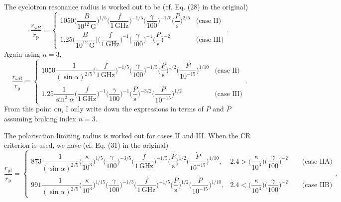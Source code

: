 \documentclass{book}
\newcommand{\rpl}{r_\text{pl}} %
\newcommand{\rwB}{r_{\omega B}} %
\newcommand{\rp}{r_\text{p}} %
\begin{document}
The cyclotron resonance radius is worked out to be (cf. Eq. (28) in the original)
\begin{equation}
    \frac{\rwB}{\rp} = \begin{cases}
        1050 \bigg(\dfrac{B}{10^{12}\,\text{G}}\bigg)^{1/5}
             \bigg(\dfrac{f}{1\,\text{GHz}}\bigg)^{-1/5}
             \bigg(\dfrac{\gamma}{100}\bigg)^{-1/5}
             \bigg(\dfrac{P}{\text{s}}\bigg)^{2/5} & \text{(case II)} \\[15pt]
        1.25 \bigg(\dfrac{B}{10^{12}\,\text{G}}\bigg)
             \bigg(\dfrac{f}{1\,\text{GHz}}\bigg)^{-1}
             \bigg(\dfrac{\gamma}{100}\bigg)^{-1}
             \bigg(\dfrac{P}{\text{s}}\bigg)^{-2} & \text{(case III)}
    \end{cases}.
\end{equation}
Again using $n=3$,
\begin{equation}
    \frac{\rwB}{\rp} = \begin{cases}
        1050 \dfrac{1}{(\sin\alpha)^{2/5}}
             \bigg(\dfrac{f}{1\,\text{GHz}}\bigg)^{-1/5}
             \bigg(\dfrac{\gamma}{100}\bigg)^{-1/5}
             \bigg(\dfrac{P}{\text{s}}\bigg)^{1/2}
             \bigg(\dfrac{\dot{P}}{10^{-15}}\bigg)^{1/10}
             & \text{(case II)} \\[15pt]
        1.25 \dfrac{1}{\sin^2\alpha}
             \bigg(\dfrac{f}{1\,\text{GHz}}\bigg)^{-1}
             \bigg(\dfrac{\gamma}{100}\bigg)^{-1}
             \bigg(\dfrac{P}{\text{s}}\bigg)^{-3/2}
             \bigg(\dfrac{\dot{P}}{10^{-15}}\bigg)^{1/2}
             & \text{(case III)}
    \end{cases}.
\end{equation}
From this point on, I only write down the expressions in terms of $P$ and $\dot{P}$ assuming braking index $n=3$.

The polarisation limiting radius is worked out for cases II and III.
When the CR criterion is used, we have (cf. Eq. (31) in the original)
\begin{equation}
    \frac{\rpl}{\rp} = \begin{cases}
        873 \dfrac{1}{(\sin\alpha)^{2/5}}
             \bigg(\dfrac{\kappa}{10^3}\bigg)^{1/5}
             \bigg(\dfrac{\gamma}{100}\bigg)^{-3/5}
             \bigg(\dfrac{f}{1\,\text{GHz}}\bigg)^{-1/5}
             \bigg(\dfrac{P}{\text{s}}\bigg)^{1/2}
             \bigg(\dfrac{\dot{P}}{10^{-15}}\bigg)^{1/10},
             & 2.4 > \bigg(\dfrac{\kappa}{10^3}\bigg) \bigg(\dfrac{\gamma}{100}\bigg)^{-2} \qquad \text{(case IIA)} \\[15pt]
        991 \dfrac{1}{(\sin\alpha)^{2/5}}
             \bigg(\dfrac{\kappa}{10^3}\bigg)^{1/15}
             \bigg(\dfrac{\gamma}{100}\bigg)^{-1/3}
             \bigg(\dfrac{f}{1\,\text{GHz}}\bigg)^{-1/5}
             \bigg(\dfrac{P}{\text{s}}\bigg)^{1/2}
             \bigg(\dfrac{\dot{P}}{10^{-15}}\bigg)^{1/10},
             & 2.4 < \bigg(\dfrac{\kappa}{10^3}\bigg) \bigg(\dfrac{\gamma}{100}\bigg)^{-2} \qquad \text{(case IIB)}
    \end{cases}.
\end{equation}
\end{document}
